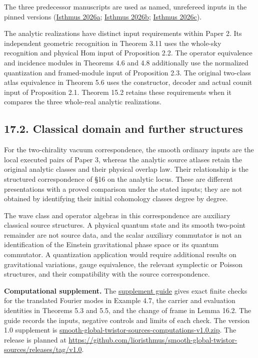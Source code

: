 \documentclass[
  english,
  11pt,
  reqno]{amsart}
\begin{document}
The three predecessor manuscripts are used as named, unrefereed inputs
in the pinned versions (\hyperref[ref-IsthmusProjective2026]{Isthmus
2026a}; \hyperref[ref-IsthmusGlobal2026]{Isthmus 2026b};
\hyperref[ref-IsthmusSmooth2026]{Isthmus 2026c}).

The analytic realizations have distinct input requirements within Paper
2. Its independent geometric recognition in Theorem 3.11 uses the
whole-sky recognition and physical Hom input of Proposition 2.2. The
operator equivalence and incidence modules in Theorems 4.6 and 4.8
additionally use the normalized quantization and framed-module input of
Proposition 2.3. The original two-class atlas equivalence in Theorem 5.6
uses the constructor, decoder and actual counit input of Proposition
2.1. Theorem 15.2 retains these requirements when it compares the three
whole-real analytic realizations.

\protect{}\label{sec:classical-domain-and-further-structures}

\subsection{17.2. Classical domain and further
structures}\label{classical-domain-and-further-structures}

For the two-chirality vacuum correspondence, the smooth ordinary inputs
are the local executed pairs of Paper 3, whereas the analytic source
atlases retain the original analytic classes and their physical overlap
law. Their relationship is the structured correspondence of §16 on the
analytic locus. These are different presentations with a proved
comparison under the stated inputs; they are not obtained by identifying
their initial cohomology classes degree by degree.

The wave class and operator algebras in this correspondence are
auxiliary classical source structures. A physical quantum state and its
smooth two-point remainder are not source data, and the scalar auxiliary
commutator is not an identification of the Einstein gravitational phase
space or its quantum commutator. A quantization application would
require additional results on gravitational variations, gauge
equivalence, the relevant symplectic or Poisson structures, and their
compatibility with the source correspondence.

\textbf{Computational supplement.} The
\href{../computations/README.md}{supplement guide} gives exact finite
checks for the translated Fourier modes in Example 4.7, the carrier and
evaluation identities in Theorems 5.3 and 5.5, and the change of frame
in Lemma 16.2. The guide records the inputs, negative controls and
limits of each check. The version 1.0 supplement is
\href{https://github.com/lioristhmus/smooth-global-twistor-sources/releases/download/v1.0/smooth-global-twistor-sources-computations-v1.0.zip}{smooth-global-twistor-sources-computations-v1.0.zip}.
The release is planned at
\url{https://github.com/lioristhmus/smooth-global-twistor-sources/releases/tag/v1.0}.
\end{document}
